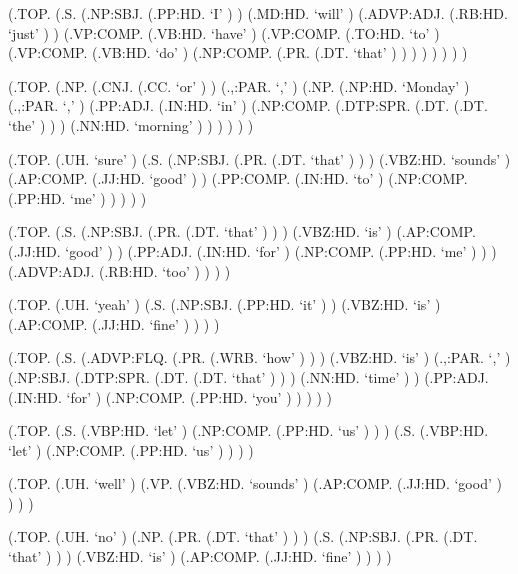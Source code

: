 \documentclass[10pt]{article}
\begin{document}
\begin{parsetree}  (.TOP. (.S. (.NP:SBJ. (.PP:HD. `I' ) ) (.MD:HD. `will' ) (.ADVP:ADJ. (.RB:HD. `just' ) ) (.VP:COMP. (.VB:HD. `have' ) (.VP:COMP. (.TO:HD. `to' ) (.VP:COMP. (.VB:HD. `do' ) (.NP:COMP. (.PR. (.DT. `that' ) ) ) ) ) ) ) ) \end{parsetree}

\begin{parsetree}  (.TOP. (.NP. (.CNJ. (.CC. `or' ) ) (.,:PAR. `,' ) (.NP. (.NP:HD. `Monday' ) (.,:PAR. `,' ) (.PP:ADJ. (.IN:HD. `in' ) (.NP:COMP. (.DTP:SPR. (.DT. (.DT. `the' ) ) ) (.NN:HD. `morning' ) ) ) ) ) ) \end{parsetree}

\begin{parsetree}  (.TOP. (.UH. `sure' ) (.S. (.NP:SBJ. (.PR. (.DT. `that' ) ) ) (.VBZ:HD. `sounds' ) (.AP:COMP. (.JJ:HD. `good' ) ) (.PP:COMP. (.IN:HD. `to' ) (.NP:COMP. (.PP:HD. `me' ) ) ) ) ) \end{parsetree}

\begin{parsetree}  (.TOP. (.S. (.NP:SBJ. (.PR. (.DT. `that' ) ) ) (.VBZ:HD. `is' ) (.AP:COMP. (.JJ:HD. `good' ) ) (.PP:ADJ. (.IN:HD. `for' ) (.NP:COMP. (.PP:HD. `me' ) ) ) (.ADVP:ADJ. (.RB:HD. `too' ) ) ) ) \end{parsetree}

\begin{parsetree}  (.TOP. (.UH. `yeah' ) (.S. (.NP:SBJ. (.PP:HD. `it' ) ) (.VBZ:HD. `is' ) (.AP:COMP. (.JJ:HD. `fine' ) ) ) ) \end{parsetree}

\begin{parsetree}  (.TOP. (.S. (.ADVP:FLQ. (.PR. (.WRB. `how' ) ) ) (.VBZ:HD. `is' ) (.,:PAR. `,' ) (.NP:SBJ. (.DTP:SPR. (.DT. (.DT. `that' ) ) ) (.NN:HD. `time' ) ) (.PP:ADJ. (.IN:HD. `for' ) (.NP:COMP. (.PP:HD. `you' ) ) ) ) ) \end{parsetree}

\begin{parsetree}  (.TOP. (.S. (.VBP:HD. `let' ) (.NP:COMP. (.PP:HD. `us' ) ) ) (.S. (.VBP:HD. `let' ) (.NP:COMP. (.PP:HD. `us' ) ) ) ) \end{parsetree}

\begin{parsetree}  (.TOP. (.UH. `well' ) (.VP. (.VBZ:HD. `sounds' ) (.AP:COMP. (.JJ:HD. `good' ) ) ) ) \end{parsetree}

\begin{parsetree}  (.TOP. (.UH. `no' ) (.NP. (.PR. (.DT. `that' ) ) ) (.S. (.NP:SBJ. (.PR. (.DT. `that' ) ) ) (.VBZ:HD. `is' ) (.AP:COMP. (.JJ:HD. `fine' ) ) ) ) \end{parsetree}
\end{document}
